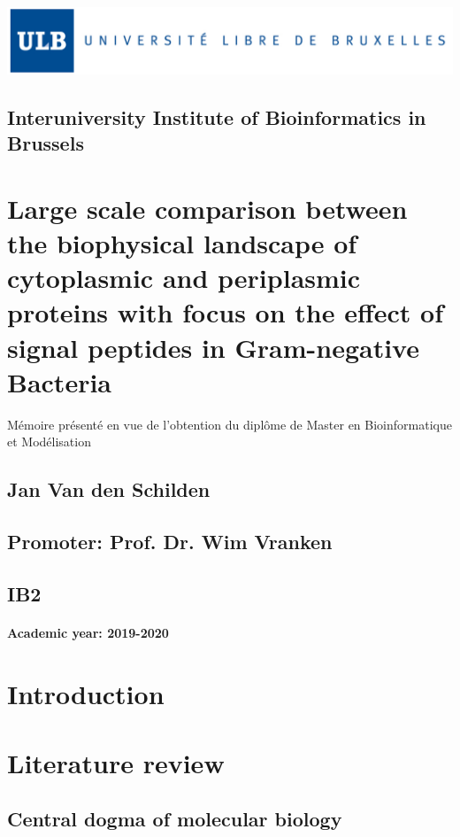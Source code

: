 \documentclass[a4paper]{article}
\begin{document}
\includegraphics[width=\linewidth]{./logo.jpg}
\subsection*{Interuniversity Institute of Bioinformatics in Brussels}
\vfill
\section*{Large scale comparison between the biophysical landscape of cytoplasmic and periplasmic proteins with focus on the effect of signal peptides in Gram-negative Bacteria}

M\'emoire pr\'esent\'e en vue de l'obtention du dipl\^ome de Master en Bioinformatique et Mod\'elisation

\vfill
\subsection*{Jan Van den Schilden}
\subsection*{Promoter: Prof. Dr. Wim Vranken}
\subsection*{IB2}
\paragraph*{Academic year: 2019-2020}
\thispagestyle{empty}
\newpage

\tableofcontents
\newpage

\section{Introduction}
	
\newpage

\section{Literature review}
%
	\subsection{Central dogma of molecular biology}
		
\end{document}
